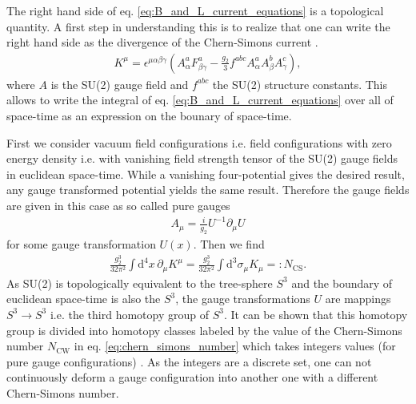\documentclass[13pt,a4paper,titlepage]{article}
\begin{document}
The right hand side of eq. \eqref{eq:B_and_L_current_equations} is a topological quantity.
A first step in understanding this is to realize that one can write the right hand side as the divergence of the Chern-Simons current \cite[eq. 4.2, 4.3]{Cline:2006ts_Baryogenesis}.
\begin{align}
    \label{eq:chern_simons_current}
    K^\mu = \epsilon^{\mu \alpha \beta \gamma} \left( A^a_\alpha F^a_{\beta \gamma} - \frac{g_2}{3} f^{abc} A^a_\alpha A^b_\beta A^c_\gamma \right),
\end{align}
where $A$ is the SU(2) gauge field and $f^{abc}$ the SU(2) structure constants.
This allows to write the integral of eq. \eqref{eq:B_and_L_current_equations}
over all of space-time as an expression on the bounary of space-time.

\noindent
First we consider vacuum field configurations i.e. field configurations with zero energy density i.e. with vanishing field strength tensor of the SU(2) gauge fields in euclidean space-time. While a vanishing four-potential gives the desired result, any gauge transformed potential yields the same result.
Therefore the gauge fields are given in this case as so called pure gauges \cite[sec. 2.1]{Di_Luzio_2020_Landscape_of_QCD_Axion_models}
\begin{align}
    A_\mu = \frac{i}{g_2} U^{-1} \partial_\mu U
\end{align}
for some gauge transformation $U(x)$.
Then we find
\begin{align}
    \label{eq:chern_simons_number}
    \frac{g_2^3}{32 \pi^2} \int \mathrm{d}^4 x \, \partial_\mu K^\mu =
    \frac{g_2^3}{32 \pi^2} \int \mathrm{d}^3 \sigma_\mu K_\mu
     =: N_{\mathrm{CS}}.
\end{align}
As SU(2) is topologically equivalent to the tree-sphere $S^3$ and the boundary of euclidean space-time is also the $S^3$, the gauge transformations $U$ are
mappings $S^3 \to S^3$ i.e. the third homotopy group of $S^3$.
It can be shown that this homotopy group is divided into homotopy classes labeled by the value of the Chern-Simons number $N_\mathrm{CW}$ in eq. \eqref{eq:chern_simons_number} which takes integers values (for pure gauge configurations) \cite{homotopy_spheres}.
As the integers are a discrete set, one can not continuously deform a gauge configuration into another one with a different Chern-Simons number.
\end{document}
